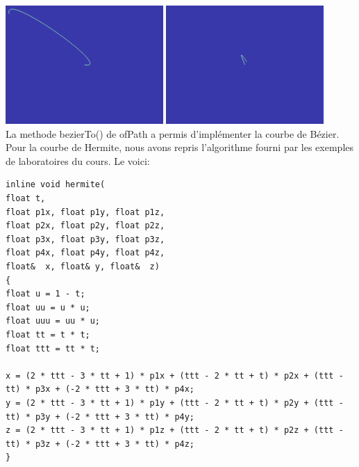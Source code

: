 \includegraphics[width=6cm]{fig/hermitecurve2.png}
\includegraphics[width=6cm]{fig/hermitecurve3.png} \\
La methode bezierTo() de ofPath a permis d'implémenter la courbe de Bézier. Pour la courbe de Hermite, nous avons repris l'algorithme fourni par les exemples de laboratoires du cours. Le voici:\\
\begin{lstlisting}
inline void hermite(
float t,
float p1x, float p1y, float p1z,
float p2x, float p2y, float p2z,
float p3x, float p3y, float p3z,
float p4x, float p4y, float p4z,
float&  x, float& y, float&  z)
{
float u = 1 - t;
float uu = u * u;
float uuu = uu * u;
float tt = t * t;
float ttt = tt * t;

x = (2 * ttt - 3 * tt + 1) * p1x + (ttt - 2 * tt + t) * p2x + (ttt - tt) * p3x + (-2 * ttt + 3 * tt) * p4x;
y = (2 * ttt - 3 * tt + 1) * p1y + (ttt - 2 * tt + t) * p2y + (ttt - tt) * p3y + (-2 * ttt + 3 * tt) * p4y;
z = (2 * ttt - 3 * tt + 1) * p1z + (ttt - 2 * tt + t) * p2z + (ttt - tt) * p3z + (-2 * ttt + 3 * tt) * p4z;
}
\end{lstlisting}

